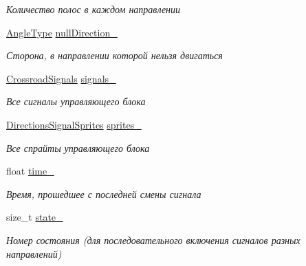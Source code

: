 \begin{DoxyCompactItemize}
\begin{DoxyCompactList}\small\item\em Количество полос в каждом направлении \end{DoxyCompactList}\item 
\mbox{\label{classrtm_1_1_control_unit_a2fe9307cb649d9c6a7f122e0363bca24}} 
\hyperlink{namespacertm_a69dc82b16a0148c10962caa83d930f89}{Angle\+Type} \hyperlink{classrtm_1_1_control_unit_a2fe9307cb649d9c6a7f122e0363bca24}{null\+Direction\+\_\+}
\begin{DoxyCompactList}\small\item\em Сторона, в направлении которой нельзя двигаться \end{DoxyCompactList}\item 
\mbox{\label{classrtm_1_1_control_unit_aace48a89b42ac67686c879c5ae61023d}} 
\hyperlink{namespacertm_afa6df86cef8e2ebcc053ad994e440354}{Crossroad\+Signals} \hyperlink{classrtm_1_1_control_unit_aace48a89b42ac67686c879c5ae61023d}{signals\+\_\+}
\begin{DoxyCompactList}\small\item\em Все сигналы управляющего блока \end{DoxyCompactList}\item 
\mbox{\label{classrtm_1_1_control_unit_a907c89505cfec93598b95c7b3e7c4664}} 
\hyperlink{namespacertm_ac9f276c8ed33ee992eb1a1f04a8254a0}{Directions\+Signal\+Sprites} \hyperlink{classrtm_1_1_control_unit_a907c89505cfec93598b95c7b3e7c4664}{sprites\+\_\+}
\begin{DoxyCompactList}\small\item\em Все спрайты управляющего блока \end{DoxyCompactList}\item 
\mbox{\label{classrtm_1_1_control_unit_a1496bfa46e8d33577118271087235e4d}} 
float \hyperlink{classrtm_1_1_control_unit_a1496bfa46e8d33577118271087235e4d}{time\+\_\+}
\begin{DoxyCompactList}\small\item\em Время, прошедшее с последней смены сигнала \end{DoxyCompactList}\item 
\mbox{\label{classrtm_1_1_control_unit_ac5da371e562f8be0aa5529a80cb866b7}} 
size\+\_\+t \hyperlink{classrtm_1_1_control_unit_ac5da371e562f8be0aa5529a80cb866b7}{state\+\_\+}
\begin{DoxyCompactList}\small\item\em Номер состояния (для последовательного включения сигналов разных направлений) \end{DoxyCompactList}\end{DoxyCompactItemize}


